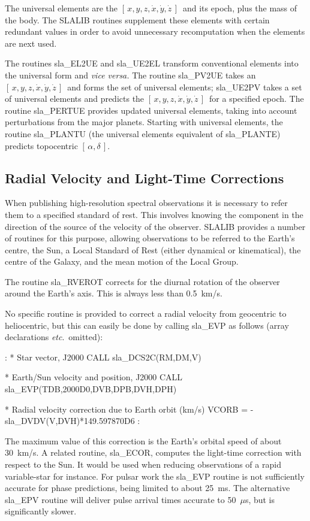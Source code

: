 \documentclass[11pt,twoside,nolof]{starlink}
\providecommand{\radec}     {$[\,\alpha,\delta\,]$}
\providecommand{\xyzxyzd}   {$[\,x,y,z,\dot{x},\dot{y},\dot{z}\,]$}
\begin{document}
The universal elements are the \xyzxyzd\ and its epoch, plus the mass
of the body.  The SLALIB routines supplement these elements with
certain redundant values in order to
avoid unnecessary recomputation when the elements are next used.

The routines
sla\_EL2UE and
sla\_UE2EL transform conventional elements into the
universal form and \textit{vice versa.}
The routine
sla\_PV2UE takes an \xyzxyzd\ and forms the set of universal
elements;
sla\_UE2PV takes a set of universal elements and predicts the \xyzxyzd\
for a specified epoch.
The routine
sla\_PERTUE provides updated universal elements,
taking into account perturbations from the major planets.
Starting with universal elements, the routine
sla\_PLANTU (the universal elements equivalent of
sla\_PLANTE) predicts topocentric \radec.

\subsection{Radial Velocity and Light-Time Corrections}
When publishing high-resolution spectral observations
it is necessary to refer them to a specified standard of rest.
This involves knowing the component in the direction of the
source of the velocity of the observer.  SLALIB provides a number
of routines for this purpose, allowing observations to be
referred to the Earth's centre, the Sun, a Local Standard of Rest
(either dynamical or kinematical), the centre of the Galaxy, and
the mean motion of the Local Group.

The routine
sla\_RVEROT
corrects for the diurnal rotation of
the observer around the Earth's axis.  This is always less than 0.5~km/s.

No specific routine is provided to correct a radial velocity
from geocentric to heliocentric, but this can easily be done by calling
sla\_EVP
as follows (array declarations \textit{etc}.\ omitted):
\goodbreak
\begin{terminalv}
             :
      *  Star vector, J2000
            CALL sla_DCS2C(RM,DM,V)

      *  Earth/Sun velocity and position, J2000
            CALL sla_EVP(TDB,2000D0,DVB,DPB,DVH,DPH)

      *  Radial velocity correction due to Earth orbit (km/s)
            VCORB = -sla_DVDV(V,DVH)*149.597870D6
             :
\end{terminalv}
\goodbreak
The maximum value of this correction is the Earth's orbital speed
of about 30~km/s.  A related routine,
sla\_ECOR,
computes the light-time correction with respect to the Sun.  It
would be used when reducing observations of a rapid variable-star
for instance.
For pulsar work the
sla\_EVP routine is not sufficiently accurate for
phase predictions, being limited to about 25~ms.  The
alternative sla\_EPV routine will deliver pulse arrival times
accurate to 50~$\mu$s, but is significantly slower.
\end{document}
